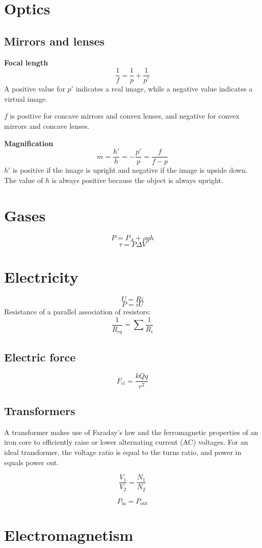 \documentclass[12pt, oneside]{book}
\newcommand*\reciprocal[1]{\frac{1}{#1}}
\begin{document}
\chapter{Optics}
\section{Mirrors and lenses}
\textbf{Focal length}
\[\reciprocal{f} = \reciprocal{p} + \reciprocal{p'}\]
A positive value for \(p'\) indicates a real image, while a negative value
indicates a virtual image.

\(f\) is positive for concave mirrors and convex lenses, and negative for convex
mirrors and concave lenses.

\textbf{Magnification}
\[m = \frac{h'}{h} = - \frac{p'}{p} = \frac{f}{f - p}\]
\(h'\) is positive if the image is upright and negative if the image is upside
down. The value of \(h\) is always positive because the object is always
upright.

\chapter{Gases}
\[P = P_A + \rho g h\]
\[\tau = P \Delta V\]

\chapter{Electricity}
\[U = R i\]
\[P = i U\]
Resistance of a parallel association of resistors:
\[\reciprocal{R_{eq}} = \sum{\reciprocal{R_i}}\]

\section{Electric force}
\[F_{el} = \frac{k Q q}{r^2}\]

\section{Transformers}
A transformer makes use of Faraday's law and the ferromagnetic properties of an
iron core to efficiently raise or lower alternating current (AC) voltages.
For an ideal transformer, the voltage ratio is equal to the turns ratio, and
power in equals power out.

\[\frac{V_1}{V_2} = \frac{N_1}{N_2}\]

\[P_{\text{in}} = P_{\text{out}}\]

\chapter{Electromagnetism}
\end{document}
